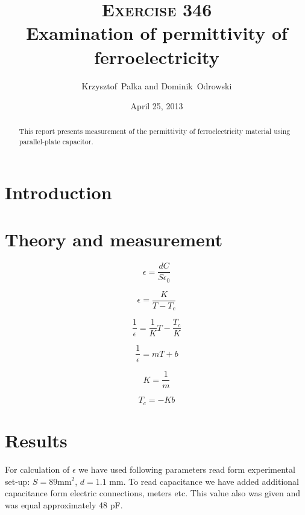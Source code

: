 \documentclass[a4paper,12pt]{article}
\author{Krzysztof~Palka and Dominik~Odrowski}
\date{April 25, 2013}
\title{\textsc{Exercise} 346 \\ Examination of permittivity of ferroelectricity}
\begin{document}
    \maketitle

    \begin{abstract}
        This report presents measurement of the permittivity of ferroelectricity material using parallel-plate capacitor.
    \end{abstract}

    \section{Introduction}
    \lipsum[1]

    \section{Theory and measurement}

    \begin{equation}
        \epsilon = \frac{d C}{S \epsilon_0} \label{eq:epsilon}
    \end{equation}
    
    \begin{equation}
        \epsilon = \frac{K}{T-T_c} \label{eq:curie}
    \end{equation}
    
    \begin{equation}
        \frac{1}{\epsilon} = \frac{1}{K} T - \frac{T_c}{K} \label{eq:curie2}
    \end{equation}
    
    \begin{equation}
        \frac{1}{\epsilon} = mT + b \label{eq:curie3}
    \end{equation}
    
    \begin{equation}
        K = \frac{1}{m} \label{eq:k}
    \end{equation}
    
    \begin{equation}
        T_c = - K b \label{eq:tc}
    \end{equation}
    

    \section{Results}

    For calculation of $\epsilon$ we have used following parameters read form experimental set-up: $S = 89 \mathrm{mm}^2$, $d = 1.1$ mm. To read capacitance we have added additional capacitance form electric connections, meters etc. This value also was given and was equal approximately 48 pF.  
\end{document}
